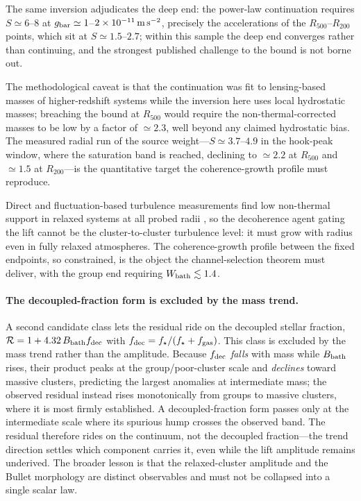 \documentclass[11pt]{article}
\begin{document}
The same inversion adjudicates the deep end: the power-law continuation requires $S\simeq6$--$8$ at $g_{\rm bar}\simeq1$--$2\times10^{-11}\,{\rm m\,s^{-2}}$, precisely the accelerations of the $R_{500}$--$R_{200}$ points, which sit at $S\simeq1.5$--$2.7$; within this sample the deep end converges rather than continuing, and the strongest published challenge to the bound is not borne out.

The methodological caveat is that the continuation was fit to lensing-based masses of higher-redshift systems while the inversion here uses local hydrostatic masses; breaching the bound at $R_{500}$ would require the non-thermal-corrected masses to be low by a factor of $\simeq2.3$, well beyond any claimed hydrostatic bias. The measured radial run of the source weight---$S\simeq3.7$--$4.9$ in the hook-peak window, where the saturation band is reached, declining to $\simeq2.2$ at $R_{500}$ and $\simeq1.5$ at $R_{200}$---is the quantitative target the coherence-growth profile must reproduce.

Direct and fluctuation-based turbulence measurements find low non-thermal support in relaxed systems at all probed radii \citep{Dupourque2023,XRISM2025}, so the decoherence agent gating the lift cannot be the cluster-to-cluster turbulence level: it must grow with radius even in fully relaxed atmospheres. The coherence-growth profile between the fixed endpoints, so constrained, is the object the channel-selection theorem must deliver, with the group end requiring $W_{\rm bath}\lesssim1.4$.

\paragraph{The decoupled-fraction form is excluded by the mass trend.}
A second candidate class lets the residual ride on the decoupled stellar fraction, $\mathcal R=1+4.32\,B_{\rm bath}f_{\rm dec}$ with $f_{\rm dec}=f_\star/(f_\star+f_{\rm gas})$. This class is excluded by the mass trend rather than the amplitude. Because $f_{\rm dec}$ \emph{falls} with mass while $B_{\rm bath}$ rises, their product peaks at the group/poor-cluster scale and \emph{declines} toward massive clusters, predicting the largest anomalies at intermediate mass; the observed residual instead rises monotonically from groups to massive clusters, where it is most firmly established. A decoupled-fraction form passes only at the intermediate scale where its spurious hump crosses the observed band. The residual therefore rides on the continuum, not the decoupled fraction---the trend direction settles which component carries it, even while the lift amplitude remains underived. The broader lesson is that the relaxed-cluster amplitude and the Bullet morphology are distinct observables and must not be collapsed into a single scalar law.
\end{document}
